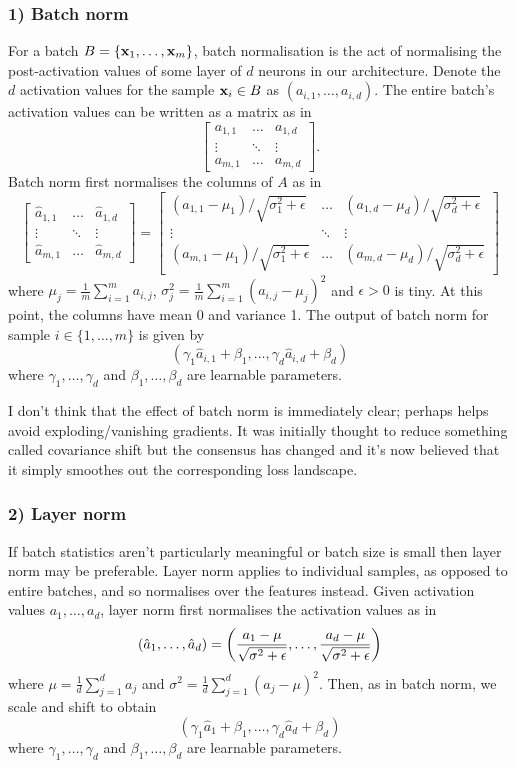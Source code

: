 \documentclass[11pt]{article}
\begin{document}
\subsubsection*{1) Batch norm}
For a batch $B=\{\mathbf{x}_1,\dots,\mathbf{x}_m\}$, batch normalisation is the act of normalising the post-activation values of some layer of $d$ neurons in our architecture. Denote the $d$ activation values for the sample $\mathbf{x}_i\in B$ as $(a_{i,1},\dots,a_{i,d})$. The entire batch's activation values can be written as a matrix as in
$$
\begin{bmatrix}
    a_{1,1} & \dots  & a_{1,d}\\
    \vdots  & \ddots & \vdots \\
    a_{m,1} & \dots  & a_{m,d}
\end{bmatrix}.
$$
Batch norm first normalises the columns of $A$ as in
$$
\begin{bmatrix}
    \hat{a}_{1,1} & \dots  & \hat{a}_{1,d}\\
    \vdots        & \ddots & \vdots       \\
    \hat{a}_{m,1} & \dots  & \hat{a}_{m,d}
\end{bmatrix}
=
\begin{bmatrix}
    (a_{1,1}-\mu_1) / \sqrt{\sigma_1^2+\epsilon} & \dots & (a_{1,d}-\mu_d) / \sqrt{\sigma_d^2+\epsilon}\\
    \vdots & \ddots & \vdots \\
    (a_{m,1}-\mu_1) / \sqrt{\sigma_1^2+\epsilon} & \dots & (a_{m,d}-\mu_d) / \sqrt{\sigma_d^2+\epsilon}
\end{bmatrix}
$$
where $\mu_j=\frac{1}{m}\sum_{i=1}^ma_{i,j}$, $\sigma_j^2=\frac{1}{m}\sum_{i=1}^m(a_{i,j}-\mu_j)^2$ and $\epsilon>0$ is tiny. At this point, the columns have mean 0 and variance 1. The output of batch norm for sample $i\in\{1,\dots,m\}$ is given by
$$
(\gamma_1\hat{a}_{i,1}+\beta_1,\dots,\gamma_d\hat{a}_{i,d}+\beta_d)
$$
where $\gamma_1,\dots,\gamma_d$ and $\beta_1,\dots,\beta_d$ are learnable parameters.

I don't think that the effect of batch norm is immediately clear; perhaps helps avoid exploding/vanishing gradients. It was initially thought to reduce something called covariance shift but the consensus has changed and it's now believed that it simply smoothes out the corresponding loss landscape.

\subsubsection*{2) Layer norm}
If batch statistics aren't particularly meaningful or batch size is small then layer norm may be preferable. Layer norm applies to individual samples, as opposed to entire batches, and so normalises over the features instead. Given activation values $a_1,\dots,a_d$, layer norm first normalises the activation values as in
$$
(\hat{a}_1,\dots,\hat{a}_d)
=
\left(\frac{a_1-\mu}{\sqrt{\sigma^2+\epsilon}},\dots,\frac{a_d-\mu}{\sqrt{\sigma^2+\epsilon}}\right)
$$
where $\mu=\frac{1}{d}\sum_{j=1}^da_j$ and $\sigma^2=\frac{1}{d}\sum_{j=1}^d(a_j-\mu)^2$. Then, as in batch norm, we scale and shift to obtain
$$
(\gamma_1\hat{a}_1+\beta_1,\dots,\gamma_d\hat{a}_d+\beta_d)
$$
where $\gamma_1,\dots,\gamma_d$ and $\beta_1,\dots,\beta_d$ are learnable parameters.
\end{document}
